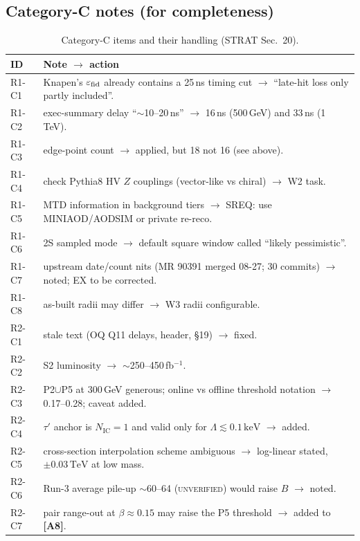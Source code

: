 \documentclass[11pt,a4paper]{article}
\newcommand{\UNV}{\textsc{unverified}}
\newcommand{\NIC}{N_{\mathrm{IC}}}
\newcommand{\TeV}{\,\mathrm{TeV}}
\newcommand{\keV}{\,\mathrm{keV}}
\newcommand{\lab}[1]{\textbf{[#1]}}
\begin{document}
\subsection{Category-C notes (for completeness)}
{\small
\begin{longtable}{@{}L{1.38cm}L{15.29cm}@{}}
\caption{Category-C items and their handling (STRAT Sec.~20).}\label{tab:catc}\\
\toprule ID & Note $\to$ action\\\midrule\endfirsthead
\bottomrule\endfoot
R1-C1 & Knapen's $\varepsilon_{\rm fid}$ already contains a 25\,ns timing cut $\to$ ``late-hit loss only partly included''.\\
R1-C2 & exec-summary delay ``$\sim$10--20\,ns'' $\to$ 16\,ns (500\,GeV) and 33\,ns (1\,TeV).\\
R1-C3 & edge-point count $\to$ applied, but 18 not 16 (see above).\\
R1-C4 & check Pythia8 HV $Z$ couplings (vector-like vs chiral) $\to$ W2 task.\\
R1-C5 & MTD information in background tiers $\to$ SREQ: use MINIAOD/AODSIM or private re-reco.\\
R1-C6 & 2S sampled mode $\to$ default square window called ``likely pessimistic''.\\
R1-C7 & upstream date/count nits (MR 90391 merged 08-27; 30 commits) $\to$ noted; EX to be corrected.\\
R1-C8 & as-built radii may differ $\to$ W3 radii configurable.\\
R2-C1 & stale text (OQ Q11 delays, header, \S19) $\to$ fixed.\\
R2-C2 & S2 luminosity $\to$ $\sim$250--450\,fb$^{-1}$.\\
R2-C3 & P2$\cup$P5 at 300\,GeV generous; online vs offline threshold notation $\to$ 0.17--0.28; caveat added.\\
R2-C4 & $\tau'$ anchor is $\NIC=1$ and valid only for $\Lambda\lesssim0.1\keV$ $\to$ added.\\
R2-C5 & cross-section interpolation scheme ambiguous $\to$ log-linear stated, $\pm0.03\TeV$ at low mass.\\
R2-C6 & Run-3 average pile-up $\sim$60--64 (\UNV) would raise $B$ $\to$ noted.\\
R2-C7 & pair range-out at $\beta\approx0.15$ may raise the P5 threshold $\to$ added to \lab{A8}.\\
\end{longtable}
}
\end{document}
